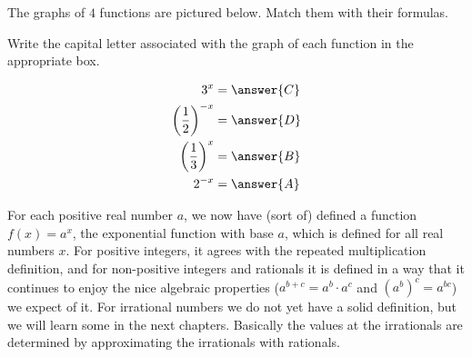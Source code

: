 \documentclass{ximera}
\begin{document}
\begin{question}
	The graphs of $4$ functions are pictured below.  Match them with their formulas.
	
	\begin{image}
\end{image} 

Write the capital letter associated with the graph of each function in the appropriate box.

\begin{align*}
3^x &=  \answer{C}\\
\left(\frac{1}{2}\right)^{-x} &= \answer{D}\\
\left(\frac{1}{3}\right)^{x} &=  \answer{B}\\
 2^{-x} &= \answer{A}
\end{align*}

\end{question}

\begin{summary}
	For each positive real number $a$, we now have (sort of) defined a function $f(x) = a^x$, the exponential function with base $a$, which is defined for all real numbers $x$.  For positive integers, it agrees with the repeated multiplication definition, and for non-positive integers and rationals it is defined in a way that it continues to enjoy the nice algebraic properties ($a^{b+c} = a^b \cdot a^c$ and $(a^b)^c = a^{bc}$) we expect of it.  For irrational numbers we do not yet have a solid definition, but we will learn some in the next chapters.  Basically the values at the irrationals are determined by approximating the irrationals with rationals.  
\end{summary}
\end{document}
